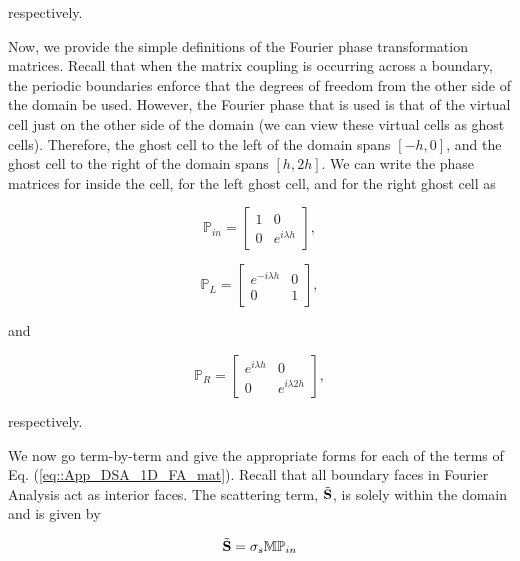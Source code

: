 \noindent respectively.

Now, we provide the simple definitions of the Fourier phase transformation matrices. Recall that when the matrix coupling is occurring across a boundary, the periodic boundaries enforce that the degrees of freedom from the other side of the domain be used. However, the Fourier phase that is used is that of the virtual cell just on the other side of the domain (we can view these virtual cells as ghost cells). Therefore, the ghost cell to the left of the domain spans $[-h,0]$, and the ghost cell to the right of the domain spans $[h,2h]$. We can write the phase matrices for inside the cell, for the left ghost cell, and for the right ghost cell as

\begin{equation}
\label{eq::App_DSA_1D_Pin}
\mathbb{P}_{in} = \left[ \begin{array}{cc}
	1 & 0 \\
	0 & e^{i \lambda h}
	\end{array} \right],
\end{equation}

\begin{equation}
\label{eq::App_DSA_1D_PL}
\mathbb{P}_L = \left[ \begin{array}{cc}
	e^{-i \lambda h} & 0 \\
	0 & 1
	\end{array} \right],
\end{equation}

\noindent and 

\begin{equation}
\label{eq::App_DSA_1D_PR}
\mathbb{P}_R = \left[ \begin{array}{cc}
	e^{i \lambda h} & 0 \\
	0 & e^{i \lambda 2h}
	\end{array} \right],
\end{equation}

\noindent respectively.

We now go term-by-term and give the appropriate forms for each of the terms of Eq. (\ref{eq::App_DSA_1D_FA_mat}). Recall that all boundary faces in Fourier Analysis act as interior faces. The scattering term, $\tilde{{\bf S}}$, is solely within the domain and is given by

\begin{equation}
\label{eq::App_DSA_1D_FA_S}
\tilde{{\bf S}} = \sigma_s \mathbb{M} \mathbb{P}_{in}
\end{equation}

